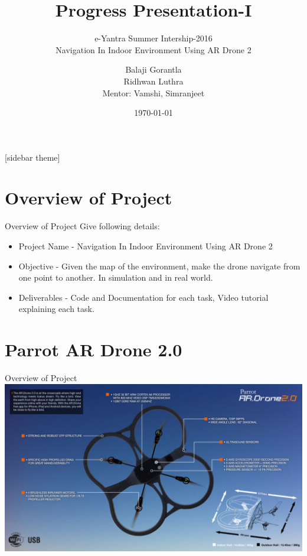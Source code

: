 \documentclass[10pt, a4paper]{beamer}
\begin{document}
	\title{Progress Presentation-I}
	\subtitle{e-Yantra Summer Intership-2016 \\ Navigation In Indoor Environment Using AR Drone 2}
	\author{Balaji Gorantla\\Ridhwan Luthra\\
	Mentor: Vamshi, Simranjeet}
	\date{\today}
	\frame{\titlepage}

[sidebar theme]

\section{Overview of Project}
\begin{frame}{Overview of Project}
	Give following details: \\
	\begin{itemize}
		\item Project Name - Navigation In Indoor Environment Using AR Drone 2
		\item Objective - Given the map of the environment, make the drone navigate from one point to another. In simulation and in real world.
		\item Deliverables - Code and Documentation for each task, Video tutorial explaining each task.
	\end{itemize}
\end{frame}

\section{Parrot AR Drone 2.0}
\begin{frame}{Overview of Project}
	\includegraphics[scale=0.265]{drone_specs}
\end{frame}
\end{document}
